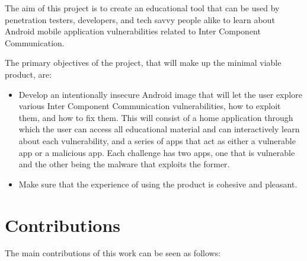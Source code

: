         The aim of this project is to create an educational tool that can be used by penetration testers, developers, and tech savvy people alike to learn about Android mobile application vulnerabilities related to Inter Component Communication.
        
        The primary objectives of the project, that will make up the minimal viable product, are:
        
        \begin{itemize}
            \item Develop an intentionally insecure Android image that will let the user explore various Inter Component Communication vulnerabilities, how to exploit them, and how to fix them. This will consist of a home application through which the user can access all educational material and can interactively learn about each vulnerability, and a series of apps that act as either a vulnerable app or a malicious app. Each challenge has two apps, one that is vulnerable and the other being the malware that exploits the former.
            \item Make sure that the experience of using the product is cohesive and pleasant.
        \end{itemize}
	
	\section{Contributions} 
		\label{sec:intro_contribs} 
		
		The main contributions of this work can be seen as follows:
		
